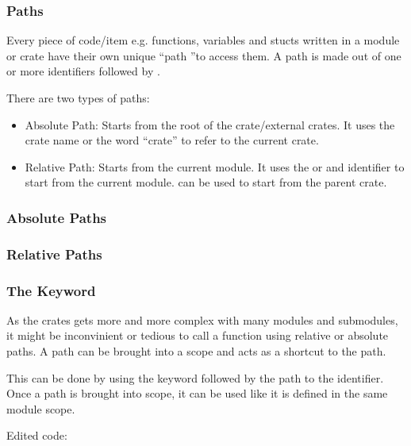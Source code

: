 \documentclass{beamer}
\begin{document}
\begin{frame}
  \frametitle{Paths}
  Every piece of code/item e.g. functions, variables and stucts written in a module or crate have their own unique ``path ''to access them.
  A path is made out of one or more identifiers followed by \inlinecode{::}.

  There are two types of paths:
  \begin{itemize}
    \item{Absolute Path: Starts from the root of the crate/external crates. It uses the crate name or the word ``crate'' to refer to the current crate.}
    \item{Relative Path: Starts from the current module. It uses the  or and identifier to start from the current module.  can be used to start from the parent crate.}
  \end{itemize}
\end{frame}

\begin{frame}
  \frametitle{Absolute Paths}
  
  
\end{frame}

\begin{frame}
  \frametitle{Relative Paths}
  
  
  
\end{frame}

\begin{frame}
  \frametitle{The  Keyword}
  As the crates gets more and more complex with many modules and submodules, it might be inconvinient or tedious to call a function using relative or absolute paths. A path can be brought into a scope and acts as a shortcut to the path.

  This can be done by using the  keyword followed by the path to the identifier. Once a path is brought into scope, it can be used like it is defined in the same module scope.
  

  Edited code:
  
\end{frame}
\end{document}

